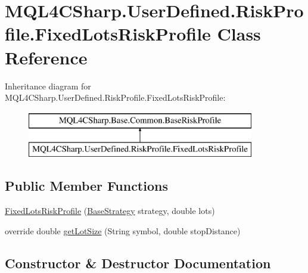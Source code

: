 \hypertarget{class_m_q_l4_c_sharp_1_1_user_defined_1_1_risk_profile_1_1_fixed_lots_risk_profile}{}\section{M\+Q\+L4\+C\+Sharp.\+User\+Defined.\+Risk\+Profile.\+Fixed\+Lots\+Risk\+Profile Class Reference}
\label{class_m_q_l4_c_sharp_1_1_user_defined_1_1_risk_profile_1_1_fixed_lots_risk_profile}
Inheritance diagram for M\+Q\+L4\+C\+Sharp.\+User\+Defined.\+Risk\+Profile.\+Fixed\+Lots\+Risk\+Profile\+:\begin{figure}[H]
\begin{center}
\leavevmode
\includegraphics[height=2.000000cm]{class_m_q_l4_c_sharp_1_1_user_defined_1_1_risk_profile_1_1_fixed_lots_risk_profile}
\end{center}
\end{figure}
\subsection*{Public Member Functions}
\begin{DoxyCompactItemize}
\item 
\hyperlink{class_m_q_l4_c_sharp_1_1_user_defined_1_1_risk_profile_1_1_fixed_lots_risk_profile_a981720e0f23486218e82e25d791038e9}{Fixed\+Lots\+Risk\+Profile} (\hyperlink{class_m_q_l4_c_sharp_1_1_base_1_1_base_strategy}{Base\+Strategy} strategy, double lots)
\item 
override double \hyperlink{class_m_q_l4_c_sharp_1_1_user_defined_1_1_risk_profile_1_1_fixed_lots_risk_profile_a65665cedc9f8f0f24a332b2a3dccbe0b}{get\+Lot\+Size} (String symbol, double stop\+Distance)
\end{DoxyCompactItemize}


\subsection{Constructor \& Destructor Documentation}
